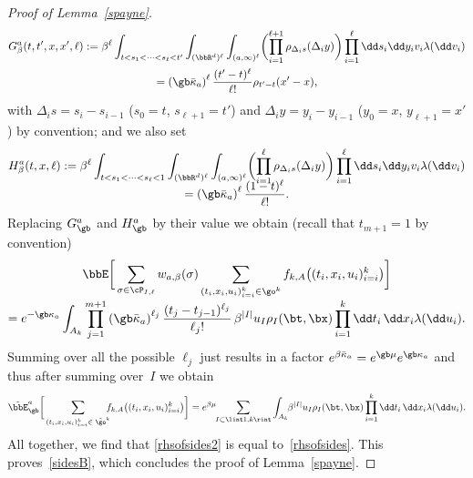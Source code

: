 \begin{proof}[Proof of Lemma~\ref{spayne}]
\begin{multline*}
G^{a}_{\beta}(t,t',x,x',\ell):=
\beta^{\ell} \int_{ t< s_1<\dots<s_{\ell}<t' } \int_{(\bbR^d)^{\ell}} \int_{(a,\infty)^\ell}
\biggl(\prod_{i=1}^{\ell+1}
\rho_{\Delta_i s}(\Delta_i y) \biggr)
\prod_{i=1}^{\ell} \dd s_i \dd y_i v_i \lambda(\dd v_i)
\\
=\left(\gb \bar \kappa_a\right)^{\ell}\frac{(t'-t)^{\ell}}{\ell!} \rho_{t'-t}(x'-x),
\end{multline*}
with $\Delta_i s = s_{i}-s_{i-1}$ ($s_0=t$, $s_{\ell+1}=t'$) and $\Delta_i y = y_{i}-y_{i-1}$ ($y_0=x$, $y_{\ell+1}=x'$) by convention;
and we also set\vspace*{-5pt}
\begin{multline*}
H^{a}_{\beta}(t,x, \ell):=
\beta^{\ell} \int_{ t< s_1<\dots<s_{\ell}<1} \int_{(\bbR^d)^{\ell}} \int_{(a,\infty)^\ell} \biggl(\prod_{i=1}^{\ell}
\rho_{\Delta_i s}(\Delta_i y) \biggr)
\prod_{i=1}^{\ell} \dd s_i \dd y_i v_i \lambda(\dd v_i)
\\[-8pt]
=\left(\gb \bar \kappa_a \right)^{\ell}\frac{(1-t)^\ell}{\ell!}.
\end{multline*}
Replacing $G_\gb^a$ and $H_{\gb}^a$ by their value we obtain (recall that $t_{m+1}=1$ by convention)\vspace*{-5pt}
\begin{multline*}
\bbE \bigg[ \sum_{\sigma\in \cP_{I,\ell} } w_{a,\beta}(\sigma)\sum_{(t_i,x_i,u_i)_{i=i}^k\in \go^k} f_{k,A}\bigl((t_i,x_i,u_i)_{i=i}^k \bigr) \bigg] \\[-3pt]
= e^{- \gb \kappa_a } \int_{A_k} \prod_{j=1}^{m+1}\left(\gb \bar \kappa_a \right)^{\ell_j}\frac{(t_{j}-t_{j-1})^{\ell_j}}{\ell_j! }\, \beta^{|I|} u_I \rho_I(\bt,\bx) \prod_{i=1}^k \dd t_i\,\dd x_i \lambda(\dd u_i).
\end{multline*}
Summing over all the possible $\ell_j$ just results in a factor $e^{\beta \bar \kappa_a} =e^{\gb \mu} e^{\gb \kappa_a}$ and thus after summing over~$I$
we obtain
\[
\tilde \bbE_{\gb}^{a} \bigg[ \sum_{(t_i,x_i,u_i)_{i=i}^k\in \; \hat \go^k}\hspace*{-2mm} f_{k,A} \bigl((t_i,x_i,u_i)_{i=i}^k \bigr) \bigg]
= e^{\beta \mu}\hspace*{-1mm} \sum_{I\subset \lint 1,k\rint}
\int_{A_k}\hspace*{-1mm} \beta^{|I|} u_I \rho_I(\bt,\bx) \prod_{i=1}^k \dd t_i\,\dd x_i \lambda(\dd u_i).
\]
All together, we find that \eqref{rhsofsides2} is equal to~\eqref{rhsofsides}. This proves~\eqref{sidesB},
which concludes the proof of Lemma~\ref{spayne}.
\end{proof}

